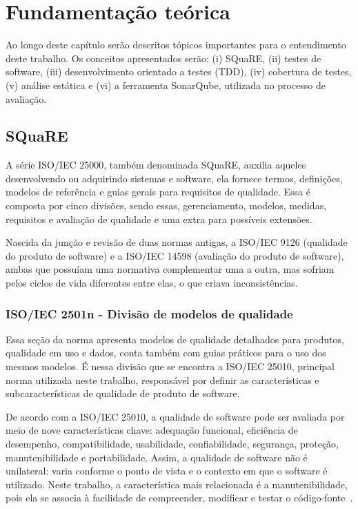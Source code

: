 \chapter{Fundamentação teórica}

Ao longo deste capítulo serão descritos tópicos importantes para o entendimento deste trabalho.
Os conceitos apresentados serão: (i) SQuaRE, (ii) testes de software, (iii) desenvolvimento orientado a testes (TDD), (iv) cobertura de testes,
(v) análise estática e (vi) a ferramenta SonarQube, utilizada no processo de avaliação.

\section{SQuaRE}

A série ISO/IEC 25000, também denominada SQuaRE, auxilia aqueles desenvolvendo ou adquirindo sistemas e software, ela fornece termos, definições, modelos de referência e guias gerais para requisitos de qualidade.
Essa é composta por cinco divisões, sendo essas, gerenciamento, modelos, medidas, requisitos e avaliação de qualidade e uma extra para possíveis extensões.

Nascida da junção e revisão de duas normas antigas, a ISO/IEC 9126 (qualidade do produto de software) e a ISO/IEC 14598 (avaliação do produto de software),
ambas que possuíam uma normativa complementar uma a outra, mas sofriam pelos ciclos de vida diferentes entre elas, o que criava inconsistências.

\subsection{ISO/IEC 2501n - Divisão de modelos de qualidade}

Essa seção da norma apresenta modelos de qualidade detalhados para produtos, qualidade em uso e dados, conta também com guias práticos para o uso dos mesmos modelos.
É nessa divisão que se encontra a ISO/IEC 25010, principal norma utilizada neste trabalho, responsável por definir as características e subcaracterísticas de qualidade de produto de software.

De acordo com a ISO/IEC 25010, a qualidade de software pode ser avaliada por meio de nove características chave:
adequação funcional, eficiência de desempenho, compatibilidade, usabilidade, confiabilidade, segurança, proteção, manutenibilidade e portabilidade. Assim, a qualidade de software não é unilateral: varia conforme o ponto de vista e o contexto em que o software é utilizado.
Neste trabalho, a característica mais relacionada é a manutenibilidade, pois ela se associa à facilidade de compreender, modificar e testar o código-fonte~\cite{iso25010}.

